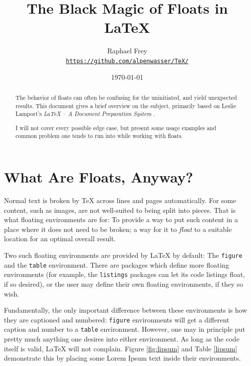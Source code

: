 \documentclass[article,a4paper,oneside,10pt]{memoir}
\title{\textsf{\Huge  The Black Magic of Floats in \LaTeX}}
\author{Raphael Frey\\[2mm]\small%
    \href{https://github.com/alpenwasser/TeX/tree/master/floats}
         {\nolinkurl{https://github.com/alpenwasser/TeX/}}}
\date{\vspace{1em}\today}
\begin{document}


\maketitle

\begin{abstract}
    The behavior  of floats can  often be  confusing for the  uninitiated, and
    yield  unexpected results. This  document gives  a brief  overview on  the
    subject, primarily based on Leslie  Lamport's \emph{\LaTeX{} -- A Document
    Preparation System} \cite{lamport}.

    I will not cover every possible edge case, but present some usage examples
    and common problem one tends to run into while working with floats.
\end{abstract}

\tableofcontents*
\listoflistings
\listoffigures
\listoftables


\newpage
\chapter{What Are Floats, Anyway?}
\label{chap:what-are-floats}

Normal text is broken by \TeX{} across lines and pages automatically. For some
content, such as images, are not  well-suited to being split into pieces. That
is what floating environments are for: To provide a way to put such content in
a place where it does not need to be broken; a way for it to \emph{float} to a
suitable location for an optimal overall result.

Two  such  floating environments  are  provided  by \LaTeX{}  by  default: The
\verb|figure|  and  the  \verb|table| environment. There  are  packages  which
define more  floating environments (for example,  the \verb|listings| packages
can let its code listings float, if  so desired), or the user may define their
own floating environments, if they so wish.

Fundamentally, the only important difference between these environments is how
they  are  captioned  and  numbered: \verb|figure|  environments  will  get  a
different caption and  number to a \verb|table|  environment. However, one may
in principle put pretty much  anything one desires into either environment. As
long  as  the  code  itself  is  valid,  \LaTeX{}  will  not  complain. Figure
\ref{fig:lipsum} and Table \ref{lipsum} demonstrate this by placing some Lorem
Ipsum text inside their environments.
\end{document}
